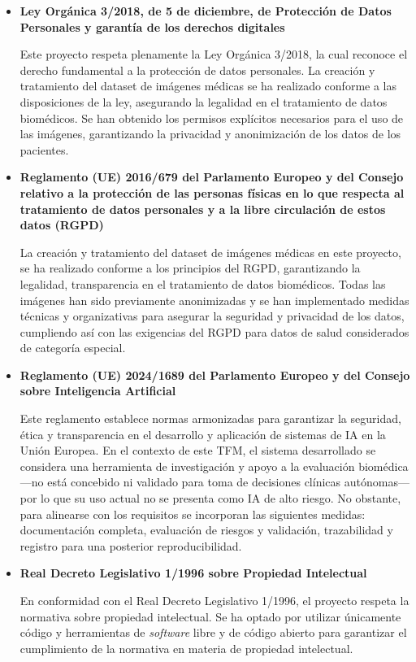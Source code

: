 \documentclass[12pt,a4paper,onecolumn,oneside]{report}
\begin{document}
\begin{itemize}
    \item \textbf{Ley Orgánica 3/2018, de 5 de diciembre, de Protección de Datos Personales y garantía de los derechos digitales}\cite{LOPD2018}
    
    Este proyecto respeta plenamente la Ley Orgánica 3/2018, la cual reconoce el derecho fundamental a la protección de datos personales. 
    La creación y tratamiento del dataset de imágenes médicas se ha realizado conforme a las disposiciones de la ley, asegurando la legalidad en el tratamiento de datos biomédicos. 
    Se han obtenido los permisos explícitos necesarios para el uso de las imágenes, garantizando la privacidad y anonimización de los datos de los pacientes. 
    
    \item \textbf{Reglamento (UE) 2016/679 del Parlamento Europeo y del Consejo relativo a la protección de las personas físicas en lo que respecta al tratamiento de datos personales y a la libre circulación de estos datos (RGPD)}\cite{RGPD2016}

    La creación y tratamiento del dataset de imágenes médicas en este proyecto, se ha realizado conforme a los principios del RGPD, garantizando la legalidad, transparencia en el 
    tratamiento de datos biomédicos. Todas las imágenes han sido previamente anonimizadas y se han implementado medidas técnicas y organizativas 
    para asegurar la seguridad y privacidad de los datos, cumpliendo así con las exigencias del RGPD para datos de salud considerados de categoría 
    especial.
    
    \item \textbf{Reglamento (UE) 2024/1689 del Parlamento Europeo y del Consejo sobre Inteligencia Artificial}\cite{ReglamentoIA2024}

    Este reglamento establece normas armonizadas para garantizar la seguridad, ética y transparencia en el desarrollo y aplicación de sistemas de IA en la Unión Europea.  
    En el contexto de este TFM, el sistema desarrollado se considera una herramienta de investigación y apoyo a la evaluación biomédica —no está concebido ni validado para toma de decisiones clínicas autónomas— 
    por lo que su uso actual no se presenta como IA de alto riesgo. No obstante, para alinearse con los requisitos se incorporan las siguientes medidas: documentación completa, evaluación de riesgos y validación, 
    trazabilidad y registro para una posterior reproducibilidad.
    
    \item \textbf{Real Decreto Legislativo 1/1996 sobre Propiedad Intelectual}\cite{RDL1996}
    
    En conformidad con el Real Decreto Legislativo 1/1996, el proyecto respeta la normativa sobre propiedad intelectual. Se ha optado por utilizar 
    únicamente código y herramientas de \textit{software} libre y de código abierto para garantizar el cumplimiento de la normativa en materia de propiedad 
    intelectual.

\end{itemize}
\end{document}
